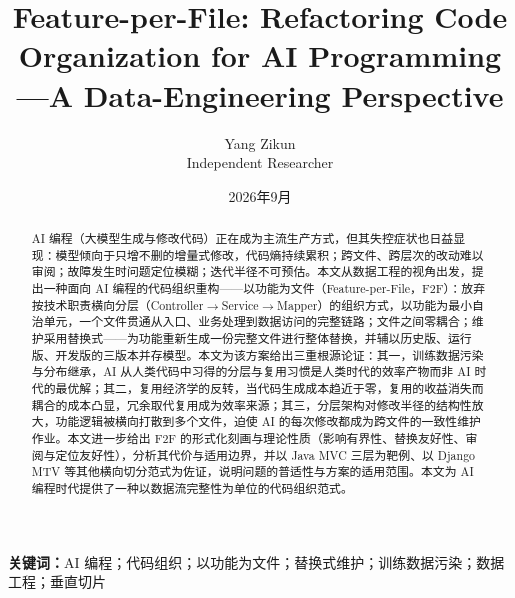 \documentclass[11pt,a4paper]{ctexart}
\title{Feature-per-File: Refactoring Code Organization for AI Programming---A Data-Engineering Perspective}
\author{Yang Zikun\\Independent Researcher}
\date{2026年9月}
\begin{document}
\maketitle

\clearpage

\tableofcontents

\clearpage


\begin{abstract}
AI 编程（大模型生成与修改代码）正在成为主流生产方式，但其失控症状也日益显现：模型倾向于只增不删的增量式修改，代码熵持续累积；跨文件、跨层次的改动难以审阅；故障发生时问题定位模糊；迭代半径不可预估。本文从数据工程的视角出发，提出一种面向 AI 编程的代码组织重构——以功能为文件（Feature-per-File，F2F）：放弃按技术职责横向分层（Controller$\rightarrow$Service$\rightarrow$Mapper）的组织方式，以功能为最小自治单元，一个文件贯通从入口、业务处理到数据访问的完整链路；文件之间零耦合；维护采用替换式——为功能重新生成一份完整文件进行整体替换，并辅以历史版、运行版、开发版的三版本并存模型。本文为该方案给出三重根源论证：其一，训练数据污染与分布继承，AI 从人类代码中习得的分层与复用习惯是人类时代的效率产物而非 AI 时代的最优解；其二，复用经济学的反转，当代码生成成本趋近于零，复用的收益消失而耦合的成本凸显，冗余取代复用成为效率来源；其三，分层架构对修改半径的结构性放大，功能逻辑被横向打散到多个文件，迫使 AI 的每次修改都成为跨文件的一致性维护作业。本文进一步给出 F2F 的形式化刻画与理论性质（影响有界性、替换友好性、审阅与定位友好性），分析其代价与适用边界，并以 Java MVC 三层为靶例、以 Django MTV 等其他横向切分范式为佐证，说明问题的普适性与方案的适用范围。本文为 AI 编程时代提供了一种以数据流完整性为单位的代码组织范式。
\end{abstract}

\noindent\textbf{关键词：}AI 编程；代码组织；以功能为文件；替换式维护；训练数据污染；数据工程；垂直切片
\end{document}
